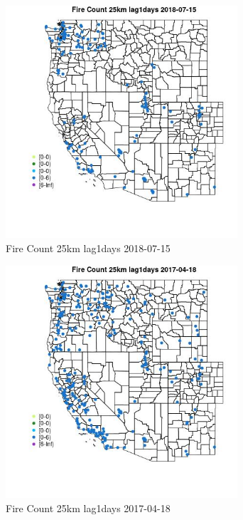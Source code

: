 \begin{figure} 
\centering  
\includegraphics[width=0.77\textwidth]{Code_Outputs/Report_ML_input_PM25_Step4_part_e_de_duplicated_aves_compiled_2019-05-21wNAs_MapObsFire_Count_25km_lag1days2018-07-15.jpg} 
\caption{\label{fig:Report_ML_input_PM25_Step4_part_e_de_duplicated_aves_compiled_2019-05-21wNAsMapObsFire_Count_25km_lag1days2018-07-15}Fire Count 25km lag1days 2018-07-15} 
\end{figure} 
 

\begin{figure} 
\centering  
\includegraphics[width=0.77\textwidth]{Code_Outputs/Report_ML_input_PM25_Step4_part_e_de_duplicated_aves_compiled_2019-05-21wNAs_MapObsFire_Count_25km_lag1days2017-04-18.jpg} 
\caption{\label{fig:Report_ML_input_PM25_Step4_part_e_de_duplicated_aves_compiled_2019-05-21wNAsMapObsFire_Count_25km_lag1days2017-04-18}Fire Count 25km lag1days 2017-04-18} 
\end{figure} 
 

